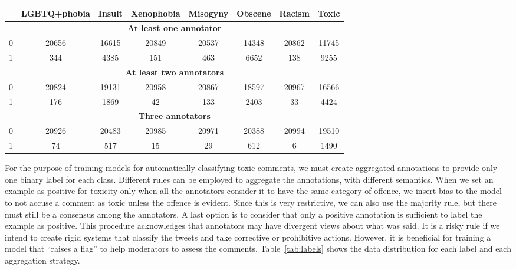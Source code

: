 \documentclass[11pt,a4paper]{article}
\begin{document}
\begin{table*}[ht]
\centering
\begin{tabular}{@{}cccccccc@{}}
\toprule
  & LGBTQ+phobia & Insult & Xenophobia & Misogyny & Obscene & \multicolumn{1}{c|}{Racism} & Toxic \\ \midrule
\multicolumn{8}{c}{\textbf{At least one annotator}}                                                       \\ \midrule
0 & 20656      & 16615  & 20849      & 20537    & 14348   & \multicolumn{1}{c|}{20862}  & 11745 \\
1 & 344        & 4385   & 151        & 463      & 6652    & \multicolumn{1}{c|}{138}    & 9255  \\ \midrule
\multicolumn{8}{c}{\textbf{At least two annotators}}                                                      \\ \midrule
0 & 20824      & 19131  & 20958      & 20867    & 18597   & \multicolumn{1}{c|}{20967}  & 16566 \\
1 & 176        & 1869   & 42         & 133      & 2403    & \multicolumn{1}{c|}{33}     & 4424  \\ \midrule
\multicolumn{8}{c}{\textbf{Three annotators}}                                                            \\ \midrule
0 & 20926      & 20483  & 20985      & 20971    & 20388   & \multicolumn{1}{c|}{20994}  & 19510 \\
1 & 74         & 517    & 15         & 29       & 612     & \multicolumn{1}{c|}{6}      & 1490  \\ \bottomrule
\end{tabular}
\label{tab:labels}
\end{table*}


For the purpose of training models for automatically classifying toxic comments, we must create aggregated annotations to provide only one binary label for each class. Different rules can be employed to aggregate the annotations, with different semantics. When we set an example as positive for toxicity only when all the annotators consider it to have the same category of offence, we insert bias to the model to not accuse a comment as toxic unless the offence is evident. Since this is very restrictive, we can also use the majority rule, but there must still be a consensus among the annotators. A last option is to consider that only a positive annotation is sufficient to label the example as positive. This procedure acknowledges that annotators may have divergent views about what was said. It is a risky rule if we intend to create rigid systems that classify the tweets and take corrective or prohibitive actions. However, it is beneficial for training a model that ``raises a flag'' to help moderators to assess the comments. Table~\ref{tab:labels} shows the data distribution for each label and each aggregation strategy.
\end{document}

